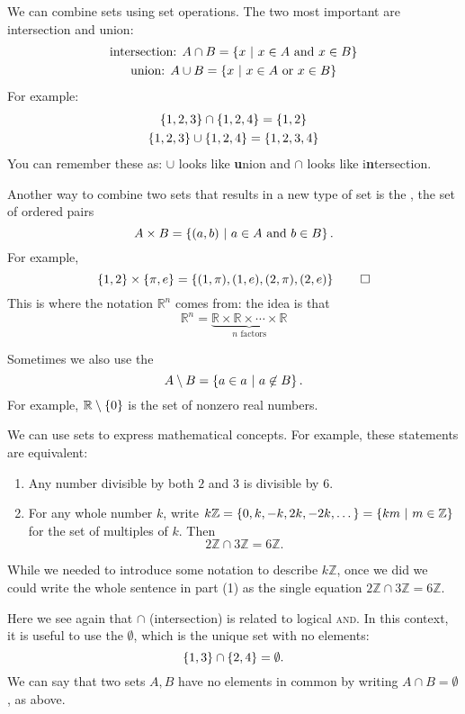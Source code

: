 \documentclass[titlepage=false]{sl2art}
\newcommand{\ZZ}{\mathbb{Z}}
\newcommand{\RR}{\mathbb{R}}
\newcommand{\set}[1]{\left\{ \def\given{\ \middle| \ }  #1 \right\}  }
\begin{document}
We can combine sets using set operations.
The two most important are intersection and union:
\begin{gather*}
  \text{intersection: }
  A \cap B = \set{x \given x \in A \text{ and } x \in B} 
  \\
  \text{union: }
  A \cup B = \set{x \given x \in A \text{ or } x \in B} 
\end{gather*}
For example:
\begin{gather*}
  \set{1, 2, 3} \cap \set{1,2,4} = \set{1,2}
  \\
  \set{1, 2, 3} \cup \set{1,2,4} = \set{1,2,3,4}
\end{gather*}
You can remember these as: \(\cup\) looks like \textbf{u}nion and  \(\cap\) looks like i\textbf{n}tersection.

Another way to combine two sets that results in a new type of set is the , the set of ordered pairs
\[
  A \times B = \set{(a,b) \given a \in A \text{ and } b \in B}.
\]
For example,
\[
  \set{1,2} \times \set{\pi, e}
  =
  \set{(1,\pi), (1,e), (2, \pi), (2, e)}
  \qedhere
\]
This is where the notation \(\RR^{n}\) comes from: the idea is that
\[
  \RR^{n} = \underbrace{\RR \times \RR \times \cdots \times \RR}_{n \text{ factors}}
\]

Sometimes we also use the 
\[
  A \setminus B = \set{a \in a \given a \not \in B}.
\]
For example, \(\RR \setminus \set{0}\) is the set of nonzero real numbers.

\begin{example}
  We can use sets to express mathematical concepts.
  For example, these statements are equivalent:
  \begin{enumerate}
    \item Any number divisible by both \(2\) and \(3\) is divisible by \(6\).
    \item For any whole number \(k\), write \(k\ZZ = \set{0, k, -k, 2k, -2k, \dots} = \set{km \given m \in \ZZ}\) for the set of multiples of \(k\).
      Then
      \[
        2\ZZ \cap 3\ZZ = 6\ZZ.
      \]
  \end{enumerate}
  While we needed to introduce some notation to describe \(k\ZZ\), once we did we could write the whole sentence in part (1) as the single equation \(2 \ZZ \cap 3 \ZZ= 6 \ZZ\).
\end{example}
Here we see again that \(\cap\) (intersection) is related to logical {\scshape and}.
In this context, it is useful to use the  \(\emptyset\), which is the unique set with no elements:
\[
  \set{1,3} \cap \set{2,4} = \emptyset.
\]
We can say that two sets \(A,B\) have no elements in common by writing \(A \cap B = \emptyset\), as above.
\end{document}

